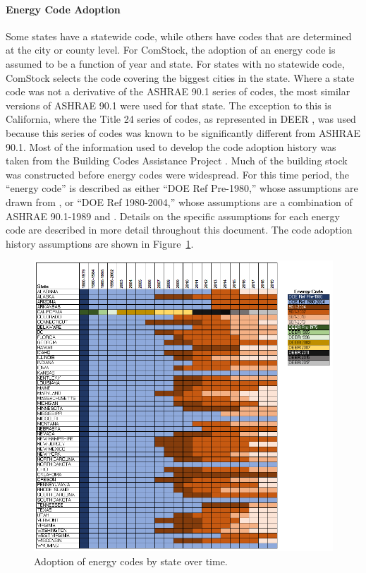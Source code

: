 \paragraph{Energy Code Adoption}
Some states have a statewide code, while others have codes that are determined at the city or county level. For ComStock, the adoption of an energy code is assumed to be a function of year and state. For states with no statewide code, ComStock selects the code covering the biggest cities in the state. Where a state code was not a derivative of the ASHRAE 90.1 series of codes, the most similar versions of ASHRAE 90.1 were used for that state. The exception to this is California, where the Title 24 series of codes, as represented in DEER \citep{cpuc_deer}, was used because this series of codes was known to be significantly different from ASHRAE 90.1. Most of the information used to develop the code adoption history was taken from the Building Codes Assistance Project \citep{building_codes_assistance}. Much of the building stock was constructed before energy codes were widespread. For this time period, the ``energy code'' is described as either ``DOE Ref Pre-1980,'' whose assumptions are drawn from \cite{doe_reference_buildings}, or ``DOE Ref 1980-2004,'' whose assumptions are a combination of ASHRAE 90.1-1989 and \cite{doe_reference_buildings}. Details on the specific assumptions for each energy code are described in more detail throughout this document. The code adoption history assumptions are shown in Figure~\ref{fig:energy_code}.

\begin{figure}
  \centering
  \includegraphics[]{figures/energy_code.png}
  \caption{Adoption of energy codes by state over time.}
  \label{fig:energy_code}
\end{figure}

